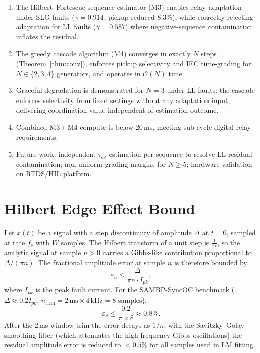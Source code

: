 \documentclass[journal,twoside,10pt]{IEEEtran}
\newcommand{\mss}{\,\text{ms}}
\begin{document}
\begin{enumerate}
  \item The Hilbert--Fortescue sequence estimator (M3) enables relay
        adaptation under SLG faults ($\gamma = 0.914$, pickup reduced
        8.3\%), while correctly rejecting adaptation for LL faults
        ($\gamma = 0.587$) where negative-sequence contamination inflates
        the residual.
  \item The greedy cascade algorithm (M4) converges in exactly $N$ steps
        (Theorem~\ref{thm:conv}), enforces pickup selectivity and IEC
        time-grading for $N \in \{2,3,4\}$ generators, and operates in
        $\mathcal{O}(N)$ time.
  \item Graceful degradation is demonstrated for $N=3$ under LL faults:
        the cascade enforces selectivity from fixed settings without any
        adaptation input, delivering coordination value independent of
        estimation outcome.
  \item Combined M3\,+\,M4 compute is below 20\,ms, meeting sub-cycle
        digital relay requirements.
  \item Future work: independent $\tau_{ac}$ estimation per sequence to
        resolve LL residual contamination; non-uniform grading margins
        for $N \geq 5$; hardware validation on RTDS/HIL platform.
\end{enumerate}

\appendix

\section{Hilbert Edge Effect Bound}
\label{app:edge}

Let $x(t)$ be a signal with a step discontinuity of amplitude $\Delta$ at
$t = 0$, sampled at rate $f_s$ with $W$ samples.
The Hilbert transform of a unit step is $\frac{1}{\pi t}$, so the
analytic signal at sample $n > 0$ carries a Gibbs-like contribution
proportional to $\Delta/(\pi n)$.
The fractional amplitude error at sample $n$ is therefore bounded by
\begin{equation}
  \varepsilon_n \leq \frac{\Delta}{\pi n \cdot I_{pk}},
  \label{eq:edge_bound}
\end{equation}
where $I_{pk}$ is the peak fault current.
For the SAMBP-SyncOC benchmark ($\Delta \approx 0.2 I_{pk}$,
$n_{\mathrm{trim}} = 2\mss \times 4\,\mathrm{kHz} = 8$ samples):
\begin{equation}
  \varepsilon_8 \leq \frac{0.2}{\pi \times 8} \approx 0.8\%.
\end{equation}
After the 2\,ms window trim the error decays as $1/n$; with the
Savitzky--Golay smoothing filter (which attenuates the high-frequency
Gibbs oscillations) the residual amplitude error is reduced to
$< 0.5\%$ for all samples used in LM fitting.


\end{document}
